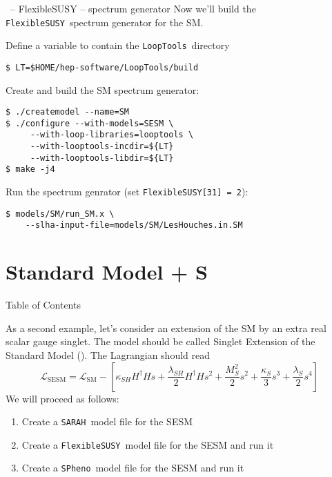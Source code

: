 \documentclass[11pt]{beamer}
\newcommand{\FlexibleSUSY}{\texttt{FlexibleSUSY}}
\newcommand{\Lagr}{\mathcal{L}}
\newcommand{\LoopTools}{\texttt{LoopTools}}
\newcommand{\SARAH}{\texttt{SARAH}}
\newcommand{\SESM}{\text{SESM}}
\newcommand{\SM}{\text{SM}}
\newcommand{\SPheno}{\texttt{SPheno}}
\begin{document}

\begin{frame}[fragile]{\insertsection\ -- FlexibleSUSY -- spectrum generator}
  Now we'll build the \FlexibleSUSY\ spectrum generator for the SM.

  \bigskip

  Define a variable to contain the \LoopTools\ directory
  \begin{lstlisting}
$ LT=$HOME/hep-software/LoopTools/build\end{lstlisting}%
  Create and build the SM spectrum generator:
  \begin{lstlisting}
$ ./createmodel --name=SM
$ ./configure --with-models=SESM \
     --with-loop-libraries=looptools \
     --with-looptools-incdir=${LT}
     --with-looptools-libdir=${LT}
$ make -j4\end{lstlisting}%
  Run the spectrum genrator (set \texttt{FlexibleSUSY[31] = 2}):
  \begin{lstlisting}
$ models/SM/run_SM.x \
    --slha-input-file=models/SM/LesHouches.in.SM\end{lstlisting}%
\end{frame}


\section{Standard Model + S}


\begin{frame}{Table of Contents}
  \tableofcontents[currentsection]
\end{frame}


\begin{frame}{\insertsection}
  As a second example, let's consider an extension of the SM by an
  extra real scalar gauge singlet. The model should be called Singlet
  Extension of the Standard Model (\SESM).  The Lagrangian should read
  \begin{equation*}
    \Lagr_{\SESM} = \Lagr_{\SM} - \left[\kappa_{SH} H^\dagger H s + \frac{\lambda_{SH}}{2} H^\dagger H s^2 + \frac{M_S^2}{2} s^2 + \frac{\kappa_S}{3} s^3 + \frac{\lambda_S}{2} s^4\right]
  \end{equation*}
  We will proceed as follows:
  \begin{enumerate}
  \item Create a \SARAH\ model file for the SESM
  \item Create a \FlexibleSUSY\ model file for the SESM and run it
  \item Create a \SPheno\ model file for the SESM and run it
  \end{enumerate}
\end{frame}
\end{document}
